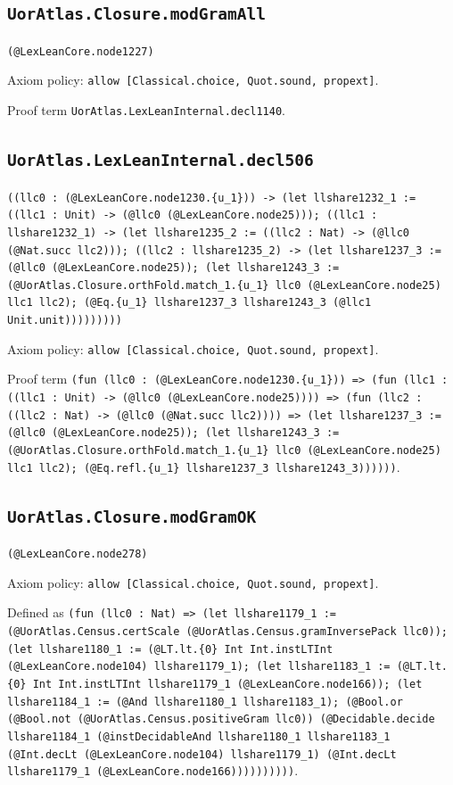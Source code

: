\documentclass[11pt]{article}
\begin{document}
\subsection*{\texttt{UorAtlas.Closure.modGramAll}}
\noindent\texttt{(@LexLeanCore.node1227)}\par
\noindent Axiom policy: \texttt{allow [Classical.choice, Quot.sound, propext]}.\par
\noindent Proof term \texttt{UorAtlas.LexLeanInternal.decl1140}.\par
\subsection*{\texttt{UorAtlas.LexLeanInternal.decl506}}
\noindent\texttt{((llc0 : (@LexLeanCore.node1230.\{u\_1\})) -> (let llshare1232\_1 := ((llc1 : Unit) -> (@llc0 (@LexLeanCore.node25))); ((llc1 : llshare1232\_1) -> (let llshare1235\_2 := ((llc2 : Nat) -> (@llc0 (@Nat.succ llc2))); ((llc2 : llshare1235\_2) -> (let llshare1237\_3 := (@llc0 (@LexLeanCore.node25)); (let llshare1243\_3 := (@UorAtlas.Closure.orthFold.match\_1.\{u\_1\} llc0 (@LexLeanCore.node25) llc1 llc2); (@Eq.\{u\_1\} llshare1237\_3 llshare1243\_3 (@llc1 Unit.unit)))))))))}\par
\noindent Axiom policy: \texttt{allow [Classical.choice, Quot.sound, propext]}.\par
\noindent Proof term \texttt{(fun (llc0 : (@LexLeanCore.node1230.\{u\_1\})) => (fun (llc1 : ((llc1 : Unit) -> (@llc0 (@LexLeanCore.node25)))) => (fun (llc2 : ((llc2 : Nat) -> (@llc0 (@Nat.succ llc2)))) => (let llshare1237\_3 := (@llc0 (@LexLeanCore.node25)); (let llshare1243\_3 := (@UorAtlas.Closure.orthFold.match\_1.\{u\_1\} llc0 (@LexLeanCore.node25) llc1 llc2); (@Eq.refl.\{u\_1\} llshare1237\_3 llshare1243\_3))))))}.\par
\subsection*{\texttt{UorAtlas.Closure.modGramOK}}
\noindent\texttt{(@LexLeanCore.node278)}\par
\noindent Axiom policy: \texttt{allow [Classical.choice, Quot.sound, propext]}.\par
\noindent Defined as \texttt{(fun (llc0 : Nat) => (let llshare1179\_1 := (@UorAtlas.Census.certScale (@UorAtlas.Census.gramInversePack llc0)); (let llshare1180\_1 := (@LT.lt.\{0\} Int Int.instLTInt (@LexLeanCore.node104) llshare1179\_1); (let llshare1183\_1 := (@LT.lt.\{0\} Int Int.instLTInt llshare1179\_1 (@LexLeanCore.node166)); (let llshare1184\_1 := (@And llshare1180\_1 llshare1183\_1); (@Bool.or (@Bool.not (@UorAtlas.Census.positiveGram llc0)) (@Decidable.decide llshare1184\_1 (@instDecidableAnd llshare1180\_1 llshare1183\_1 (@Int.decLt (@LexLeanCore.node104) llshare1179\_1) (@Int.decLt llshare1179\_1 (@LexLeanCore.node166))))))))))}.\par
\end{document}

